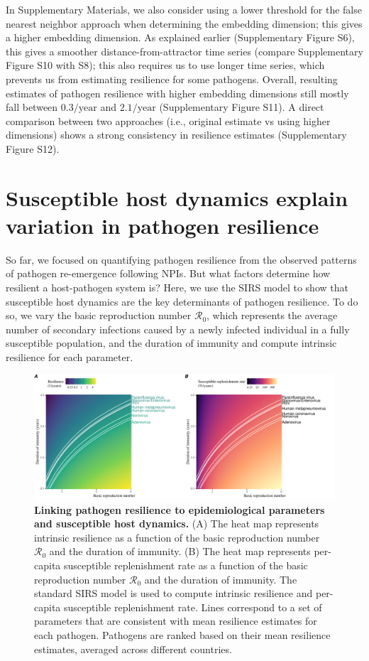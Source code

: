 \documentclass[12pt]{article}
\begin{document}
In Supplementary Materials, we also consider using a lower threshold for the false nearest neighbor approach when determining the embedding dimension;
this gives a higher embedding dimension.
As explained earlier (Supplementary Figure S6), this gives a smoother distance-from-attractor time series (compare Supplementary Figure S10 with S8);
this also requires us to use longer time series, which prevents us from estimating resilience for some pathogens.
Overall, resulting estimates of pathogen resilience with higher embedding dimensions still mostly fall between $0.3/\mathrm{year}$ and $2.1/\mathrm{year}$ (Supplementary Figure S11).
A direct comparison between two approaches (i.e., original estimate vs using higher dimensions) shows a strong consistency in resilience estimates (Supplementary Figure S12).

\section*{Susceptible host dynamics explain variation in pathogen resilience}

So far, we focused on quantifying pathogen resilience from the observed patterns of pathogen re-emergence following NPIs.
But what factors determine how resilient a host-pathogen system is?
Here, we use the SIRS model to show that susceptible host dynamics are the key determinants of pathogen resilience.
To do so, we vary the basic reproduction number $\mathcal R_0$, which represents the average number of secondary infections caused by a newly infected individual in a fully susceptible population, and the duration of immunity and compute intrinsic resilience for each parameter.

\begin{figure}[!th]
\begin{center}
\includegraphics[width=\textwidth]{../figure_summary/figure_summary.pdf}
\caption{
\textbf{Linking pathogen resilience to epidemiological parameters and susceptible host dynamics.}
(A) The heat map represents intrinsic resilience as a function of the basic reproduction number $\mathcal R_0$ and the duration of immunity.
(B) The heat map represents per-capita susceptible replenishment rate as a function of the basic reproduction number $\mathcal R_0$ and the duration of immunity.
The standard SIRS model is used to compute intrinsic resilience and per-capita susceptible replenishment rate.
Lines correspond to a set of parameters that are consistent with mean resilience estimates for each pathogen.
Pathogens are ranked based on their mean resilience estimates, averaged across different countries.
}
\end{center}
\end{figure}
\end{document}
